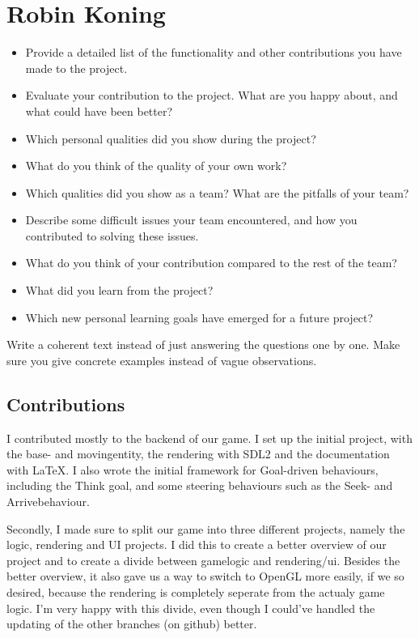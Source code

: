 \section{Robin Koning}
\begin{itemize}
    \item Provide a detailed list of the functionality and other 
    contributions you have made to the project.
    \item Evaluate your contribution to the project. What are you happy 
    about, and what could have been better?
    \item Which personal qualities did you show during the project?
    \item What do you think of the quality of your own work?
    \item Which qualities did you show as a team? What are the pitfalls of your team?
    \item Describe some difficult issues your team encountered, and how you 
    contributed to solving these issues.
    \item What do you think of your contribution compared to the rest of 
    the team?
    \item What did you learn from the project?
    \item Which new personal learning goals have emerged for a future project?
\end{itemize}

Write  a  coherent  text  instead  of  just  answering  the  questions  one  by  one.   Make
sure you give concrete examples instead of vague observations.

\subsection{Contributions}
I contributed mostly to the backend of our game. I set up the initial 
project, with the base- and movingentity, the rendering with SDL2 and the 
documentation with \LaTeX. I also wrote the initial framework for 
Goal-driven behaviours, including the Think goal, and some steering 
behaviours such as the Seek- and Arrivebehaviour. 

Secondly, I made sure to split our game into three different projects, 
namely the logic, rendering and UI projects. I did this to create a better 
overview of our project and to create a divide between gamelogic and 
rendering/ui. Besides the better overview, it also gave us a way to switch to 
OpenGL more easily, if we so desired, because the rendering is completely 
seperate from the actualy game logic. I'm very happy with this divide, even 
though I could've handled the updating of the other branches (on github) 
better.

